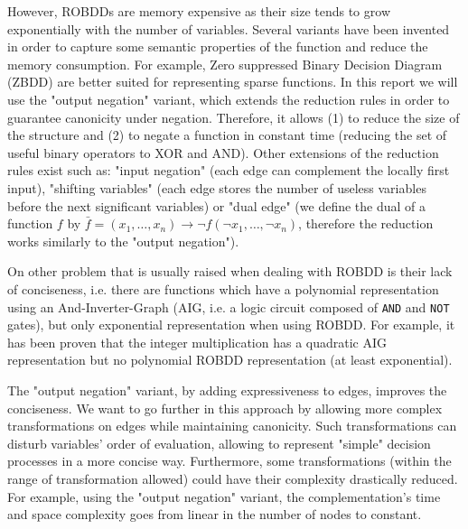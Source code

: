 \documentclass[a4paper,10pt]{article}
\begin{document}


However, ROBDDs are memory expensive as their size tends to grow exponentially with the number of variables.
Several variants have been invented in order to capture some semantic properties of the function and reduce the memory consumption.
For example, Zero suppressed Binary Decision Diagram (ZBDD) are better suited for representing sparse functions.
In this report we will use the "output negation" variant\cite{BryantVariantN}, which extends the reduction rules in order to guarantee canonicity under negation.
Therefore, it allows (1) to reduce the size of the structure and (2) to negate a function in constant time (reducing the set of useful binary operators to XOR and AND).
Other extensions of the reduction rules exist such as: "input negation"\cite{MinatoVariants} (each edge can complement the locally first input), "shifting variables"\cite{MinatoVariants} (each edge stores the number of useless variables before the next significant variables) or "dual edge"\cite{RolfVariantDual} (we define the dual of a function $f$ by $\bar{f} = (x_1, \dots, x_n) \longrightarrow \lnot f(\lnot x_1, \dots, \lnot x_n)$, therefore the reduction works similarly to the "output negation").


On other problem that is usually raised when dealing with ROBDD is their lack of conciseness, i.e. there are functions which have a polynomial representation using an And-Inverter-Graph (AIG, i.e. a logic circuit composed of \texttt{AND} and \texttt{NOT} gates), but only exponential representation when using ROBDD.
For example, it has been proven \cite{Bryant1986} that the integer multiplication has a quadratic AIG representation but no polynomial ROBDD representation (at least exponential).

The "output negation" variant, by adding expressiveness to edges, improves the conciseness.
We want to go further in this approach by allowing more complex transformations on edges while maintaining canonicity.
Such transformations can disturb variables' order of evaluation, allowing to represent "simple" decision processes in a more concise way.
Furthermore, some transformations (within the range of transformation allowed) could have their complexity drastically reduced.
For example, using the "output negation" variant, the complementation's time and space complexity goes from linear in the number of nodes to constant.
\end{document}
